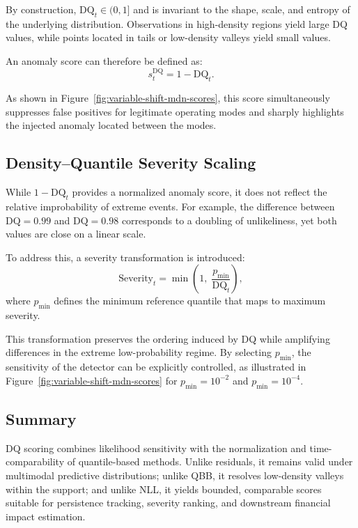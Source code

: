 By construction, $\text{DQ}_t \in (0,1]$ and is invariant to the shape, scale, and entropy of the underlying distribution. Observations in high-density regions yield large \ac{DQ} values, while points located in tails or low-density valleys yield small values.

An anomaly score can therefore be defined as:
\begin{equation}
	s_t^{\text{DQ}} = 1 - \text{DQ}_t.
\end{equation}

As shown in Figure~\ref{fig:variable-shift-mdn-scores}, this score simultaneously suppresses false positives for legitimate operating modes and sharply highlights the injected anomaly located between the modes.

\subsection{Density--Quantile Severity Scaling}
\label{subsec:density-quantile-severity}
While $1-\text{DQ}_t$ provides a normalized anomaly score, it does not reflect the {relative improbability} of extreme events. For example, the difference between $\text{DQ}=0.99$ and $\text{DQ}=0.98$ corresponds to a doubling of unlikeliness, yet both values are close on a linear scale.

To address this, a severity transformation is introduced:
\begin{equation}
	\text{Severity}_t = \min\!\left(1,\; \frac{p_{\min}}{\text{DQ}_t}\right),
\end{equation}	
where $p_{\min}$ defines the minimum reference quantile that maps to maximum severity.

This transformation preserves the ordering induced by \ac{DQ} while amplifying differences in the extreme low-probability regime. By selecting $p_{\min}$, the sensitivity of the detector can be explicitly controlled, as illustrated in Figure~\ref{fig:variable-shift-mdn-scores} for $p_{\min}=10^{-2}$ and $p_{\min}=10^{-4}$.

\subsection{Summary}

\ac{DQ} scoring combines likelihood sensitivity with the normalization and
time-comparability of quantile-based methods. Unlike residuals, it remains valid under
multimodal predictive distributions; unlike \ac{QBB}, it resolves low-density valleys
within the support; and unlike \ac{NLL}, it yields bounded, comparable scores suitable
for persistence tracking, severity ranking, and downstream financial impact estimation.

